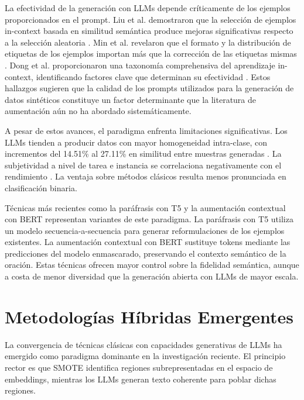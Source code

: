 La efectividad de la generación con LLMs depende críticamente de los ejemplos proporcionados en el prompt. Liu et al. demostraron que la selección de ejemplos in-context basada en similitud semántica produce mejoras significativas respecto a la selección aleatoria \cite{liu2022makes}. Min et al. revelaron que el formato y la distribución de etiquetas de los ejemplos importan más que la corrección de las etiquetas mismas \cite{min2022rethinking}. Dong et al. proporcionaron una taxonomía comprehensiva del aprendizaje in-context, identificando factores clave que determinan su efectividad \cite{dong2024survey}. Estos hallazgos sugieren que la calidad de los prompts utilizados para la generación de datos sintéticos constituye un factor determinante que la literatura de aumentación aún no ha abordado sistemáticamente.

A pesar de estos avances, el paradigma enfrenta limitaciones significativas. Los LLMs tienden a producir datos con mayor homogeneidad intra-clase, con incrementos del 14.51\% al 27.11\% en similitud entre muestras generadas \cite{howtogood2024synthetic}. La subjetividad a nivel de tarea e instancia se correlaciona negativamente con el rendimiento \cite{li2023synthetic}. La ventaja sobre métodos clásicos resulta menos pronunciada en clasificación binaria.

Técnicas más recientes como la paráfrasis con T5 y la aumentación contextual con BERT representan variantes de este paradigma. La paráfrasis con T5 utiliza un modelo secuencia-a-secuencia para generar reformulaciones de los ejemplos existentes. La aumentación contextual con BERT sustituye tokens mediante las predicciones del modelo enmascarado, preservando el contexto semántico de la oración. Estas técnicas ofrecen mayor control sobre la fidelidad semántica, aunque a costa de menor diversidad que la generación abierta con LLMs de mayor escala.

\section{Metodologías Híbridas Emergentes}

La convergencia de técnicas clásicas con capacidades generativas de LLMs ha emergido como paradigma dominante en la investigación reciente. El principio rector es que SMOTE identifica regiones subrepresentadas en el espacio de embeddings, mientras los LLMs generan texto coherente para poblar dichas regiones.

